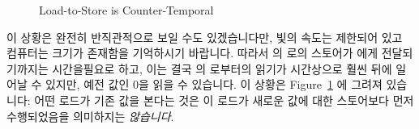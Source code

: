 \QuickQuizLabel{\MemorderQQLitmusTestR}

\begin{figure}[htbp]
\centering
{}
\caption{Load-to-Store is Counter-Temporal}
\label{fig:memorder:Load-to-Store is Counter-Temporal}
\end{figure}

이 상황은 완전히 반직관적으로 보일 수도 있겠습니다만, 빛의 속도는 제한되어 있고
컴퓨터는 크기가 존재함을 기억하시기 바랍니다.
따라서  의  로의 스토어가  에게 전달되기까지는
시간을필요로 하고, 이는 결국  의  로부터의 읽기가 시간상으로
훨씬 뒤에 일어날 수 있지만, 예전 값인 0을 읽을 수 있습니다.
이 상황은
Figure~\ref{fig:memorder:Load-to-Store is Counter-Temporal} 에 그려져 있습니다:
어떤 로드가 기존 값을 본다는 것은 이 로드가 새로운 값에 대한 스토어보다 먼저
수행되었음을 의미하지는 \emph{않습니다}.

